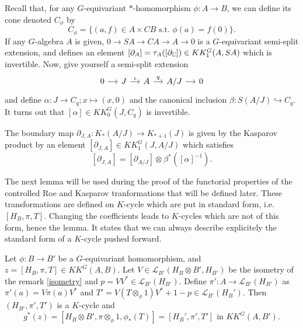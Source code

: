 Recall that, for any $G$-equivariant $*$-homomorphism $\phi : A \rightarrow B$, we can define its cone denoted $C_\phi$ by 
\[C_\phi = \{(a,f)\in A\times CB \text{ s.t. } \phi(a)=f(0)\}.\]
If any $G$-algebra $A$ is given, $0\rightarrow SA\rightarrow CA\rightarrow A \rightarrow 0$ is a $G$-equivariant semi-split extension, and defines an element $[\partial_A]=\tau_A([\partial_\mathbb C])\in KK^G_1(A,SA)$ which is invertible. Now, give yourself a semi-split extension 
\[\begin{tikzcd}[column sep = small]0 \arrow{r} & J \arrow{r}{\iota} & A \arrow{r}{q} & A/J \arrow{r}& 0 \end{tikzcd}\] 
and define $\alpha : J\rightarrow C_q ; x\mapsto (x,0)$ and the canonical inclusion $\beta : S (A/J)\hookrightarrow C_q$. It turns out that $[\alpha]\in KK_0^G(J,C_q)$ is invertible.

\begin{prop}
The boundary map $\partial_{J,A} : K_*(A/J)\rightarrow K_{*+1}(J)$ is given by the Kasparov product by an element $[\partial_{J,A}]\in KK^G_1(J,A/J)$ which satisfies 
\[[\partial_{J,A}] = [\partial_{A/J}]\otimes_{} \beta^*([\alpha]^{-1}).\]
\end{prop}

The next lemma will be used during the proof of the functorial properties of the controlled Roe and Kasparov tranformations that will be defined later. These transformations are defined on $K$-cycle which are put in standard form, i.e. $[H_B,\pi,T]$. Changing the coefficients leads to $K$-cycles which are not of this form, hence the lemma. It states that we can always describe explicitely the standard form of a $K$-cycle pushed forward.

\begin{lem}\label{isometryKK}
Let $\phi : B\rightarrow B'$ be a $G$-equivariant homomorphism, and $z=[H_B,\pi, T]\in KK^G(A,B)$. Let $V\in\mathcal L_{B'}(H_B\otimes B', H_{B'})$ be the isometry of the remark \ref{isometry} and $p = VV^*\in\mathcal L_{B'}(H_{B'})$. Define $\pi' : A\rightarrow \mathcal L_{B'}(H_{B'})$ as $\pi'(a) = V\pi(a)V^*$ and $T'= V(T\otimes_\phi 1)V^* + 1-p \in \mathcal L_{B'}(H_B')$. Then $(H_{B'},\pi',T')$ is a $K$-cycle and 
\[g^*(z) = [H_B\otimes B',\pi\otimes_\phi 1,\phi_*(T)]=[H_B', \pi', T']\text{ in } KK^G(A,B').\]
\end{lem} 

